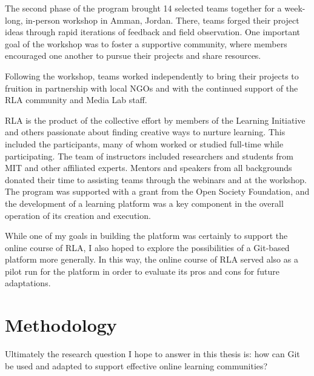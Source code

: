 \documentclass[12pt,twoside]{mitthesis}
\begin{document}
The second phase of the program brought 14 selected teams together for a week-long, in-person workshop in Amman, Jordan. There, teams forged their project ideas through rapid iterations of feedback and field observation. One important goal of the workshop was to foster a supportive community, where members encouraged one another to pursue their projects and share resources.

Following the workshop, teams worked independently to bring their projects to fruition in partnership with local NGOs and with the continued support of the RLA community and Media Lab staff.~\cite{rla}

RLA is the product of the collective effort by members of the Learning Initiative and others passionate about finding creative ways to nurture learning. This included the participants, many of whom worked or studied full-time while participating. The team of instructors included researchers and students from MIT and other affiliated experts. Mentors and speakers from all backgrounds donated their time to assisting teams through the webinars and at the workshop. The program was supported with a grant from the Open Society Foundation, and the development of a learning platform was a key component in the overall operation of its creation and execution.

While one of my goals in building the platform was certainly to support the online course of RLA, I also hoped to explore the possibilities of a Git-based platform more generally. In this way, the online course of RLA served also as a pilot run for the platform in order to evaluate its pros and cons for future adaptations. 

\section{Methodology}

Ultimately the research question I hope to answer in this thesis is: how can Git be used and adapted to support effective online learning communities?
\end{document}
